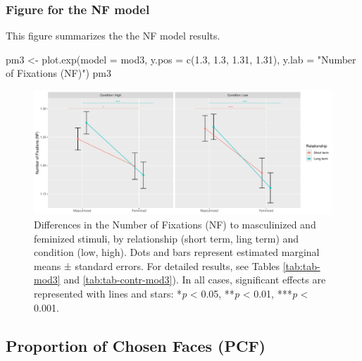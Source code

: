 \documentclass[
  bookmarksnumbered]{article}
\newenvironment{Shaded}{\begin{snugshade}}{\end{snugshade}}
\newcommand{\AttributeTok}[1]{\textcolor[rgb]{0.80,0.80,0.80}{#1}}
\newcommand{\FloatTok}[1]{\textcolor[rgb]{0.75,0.75,0.82}{#1}}
\newcommand{\FunctionTok}[1]{\textcolor[rgb]{0.94,0.94,0.56}{#1}}
\newcommand{\NormalTok}[1]{\textcolor[rgb]{0.80,0.80,0.80}{#1}}
\newcommand{\OtherTok}[1]{\textcolor[rgb]{0.94,0.94,0.56}{#1}}
\newcommand{\StringTok}[1]{\textcolor[rgb]{0.80,0.58,0.58}{#1}}
\begin{document}
\subsubsection{Figure for the NF model}\label{figure-for-the-nf-model}

This figure summarizes the the NF model results.

\begin{Shaded}
\begin{Highlighting}[]
\NormalTok{pm3 }\OtherTok{\textless{}{-}} \FunctionTok{plot.exp}\NormalTok{(}\AttributeTok{model =}\NormalTok{ mod3, }
                \AttributeTok{y.pos =} \FunctionTok{c}\NormalTok{(}\FloatTok{1.3}\NormalTok{, }\FloatTok{1.3}\NormalTok{, }\FloatTok{1.31}\NormalTok{, }\FloatTok{1.31}\NormalTok{),}
                \AttributeTok{y.lab =} \StringTok{"Number of Fixations (NF)"}\NormalTok{)}
\NormalTok{pm3}
\end{Highlighting}
\end{Shaded}

\begin{figure}
\centering
\includegraphics{Supplementary_material_files/figure-latex/fig-mod3-1.pdf}
\caption{\label{fig:fig-mod3}Differences in the Number of Fixations (NF) to masculinized and feminized stimuli, by relationship (short term, ling term) and condition (low, high). Dots and bars represent estimated marginal means ± standard errors. For detailed results, see Tables \ref{tab:tab-mod3} and \ref{tab:tab-contr-mod3}). In all cases, significant effects are represented with lines and stars: *\emph{p} \textless{} 0.05, **\emph{p} \textless{} 0.01, ***\emph{p} \textless{} 0.001.}
\end{figure}

\subsection{Proportion of Chosen Faces (PCF)}\label{proportion-of-chosen-faces-pcf}
\end{document}
